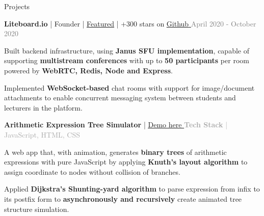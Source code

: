 \documentclass[hidelinks]{resume} %
\begin{document}
\begin{rSection}{Projects}

\begin{rSubsection}{\textbf{Liteboard.io} | Founder | \href{https://falauniversidades.com.br/projeto-gratuito-simplifica-o-acesso-as-aulas-on-line/}{\underline{Featured}} | +300 stars on \href{https://github.com/jeverd/lecture-experience}{\underline{Github} \faGithub}}{\textcolor{gray}{April 2020 - October 2020}}{}
        \par
        \begin{bulletpoints}
            \vspace{-.10cm}
            \item Built backend infrastructure, using \textbf{Janus SFU implementation}, capable of supporting \textbf{multistream conferences} with up to \textbf{50 participants} per room powered by \textbf{WebRTC, Redis, Node and Express}.
             \vspace{-.13cm}
            \item Implemented \textbf{WebSocket-based} chat rooms with support for image/document attachments to enable concurrent messaging system between students and lecturers in the platform.
            \vspace{-.25cm}
        \end{bulletpoints}
\end{rSubsection}

\begin{rSubsection}{{\textbf{Arithmetic Expression Tree Simulator}} |
\href{https://lnogueir.github.io/expression-tree-gen/}{\underline{Demo here } \faGithub}}{\textcolor{darkgray}{\textbf{Tech Stack} | JavaScript, HTML, CSS}}{}
\par
    \begin{bulletpoints}
    \vspace{-.10cm}
        \item A web app that, with animation, generates \textbf{binary trees} of arithmetic expressions with pure JavaScript by applying \textbf{Knuth's layout algorithm} to assign coordinate to nodes without collision of branches.
        \vspace{-.13cm}
        \item Applied \textbf{Dijkstra's Shunting-yard algorithm} to parse expression from infix to its postfix form to \textbf{asynchronously and recursively} create animated tree structure simulation.
        \vspace{-.25cm}
    \end{bulletpoints}
\end{rSubsection}

\end{rSection}






\end{document}
